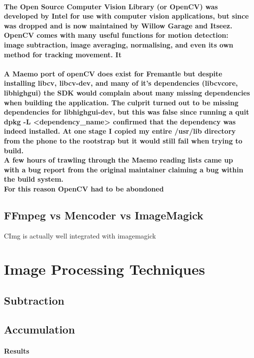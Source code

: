 \documentclass[11pt]{article} %
\begin{document}
\paragraph{The Open Source Computer Vision Library (or OpenCV) was developed by Intel for use with computer vision applications, but since was dropped and is now maintained by Willow Garage and Itseez.
\\OpenCV comes with many useful functions for motion detection: image subtraction, image averaging, normalising, and even its own method for tracking movement. It
}

\paragraph{
A Maemo port of openCV does exist for Fremantle \cite{libcv} but despite installing libcv, libcv-dev, and many of it's dependencies (libcvcore, libhighgui) the SDK would complain about many missing dependencies when building the application. The culprit turned out to be missing dependencies for libhighgui-dev, but this was false since running a quit dpkg -L <dependency\_name> confirmed that the dependency was indeed installed. At one stage I copied my entire /usr/lib directory from the phone to the rootstrap but it would still fail when trying to build.\\
A few hours of trawling through the Maemo reading lists came up with a bug report \cite{highgui-dev} from the original maintainer claiming a bug within the build system.\\
For this reason OpenCV had to be abondoned
}


\subsection{FFmpeg vs Mencoder vs ImageMagick}{CImg is actually well integrated with imagemagick}
\section{Image Processing Techniques}
\subsection{Subtraction}
\subsection{Accumulation}
\paragraph{Results}
\end{document}
